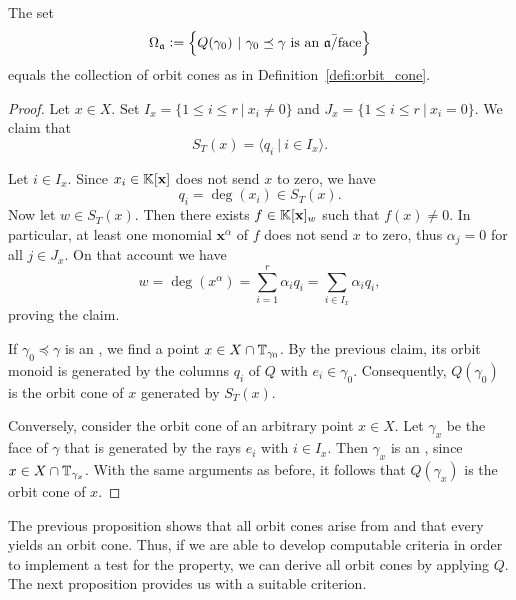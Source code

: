 \begin{prop}
	\label{prop:aface_orbit_cone_correspondence}
	The set
	$$\Omega_\ideal \defeq \left\{Q(\gamma_0)\ |\ \gamma_0\preceq\gamma \text{ is an } \ideal\text{\=/face}\right\}$$
	equals the collection of orbit cones as in Definition~\ref{defi:orbit_cone}.
\end{prop}
\begin{proof}
	Let $x\in X$. Set $I_x = \{1 \leq i \leq r\ |\ x_i \neq 0\}$ and $J_x = \{1 \leq i \leq r\ |\ x_i = 0\}$. We claim that
	$$S_T(x) = \langle q_i\ |\ i\in I_x\rangle.$$
	
	Let $i\in I_x$. Since $x_i\in\mathbb{K}[\mathbf{x}]$ does not send $x$ to zero, we have
	$$q_i = \deg(x_i)\in S_T(x).$$
	Now let $w\in S_T(x)$. Then there exists $f\in\mathbb{K}[\mathbf{x}]_w$ such that $f(x) \neq 0$. In particular, at least one monomial $\mathbf{x}^\alpha$ of $f$ does not send $x$ to zero, thus $\alpha_j = 0$ for all $j\in J_x$. On that account we have
	$$w = \deg(x^\alpha) = \sum_{i=1}^r \alpha_i q_i = \sum_{i\in I_x} \alpha_i q_i,$$
	proving the claim.
	
	If $\gamma_0\preceq\gamma$ is an \aface{}, we find a point $x\in X\cap \mathbb{T}_{\gamma_0}$. By the previous claim, its orbit monoid is generated by the columns $q_i$ of $Q$ with $e_i\in\gamma_0$. Consequently, $Q(\gamma_0)$ is the orbit cone of $x$ generated by $S_T(x)$.
	
	Conversely, consider the orbit cone of an arbitrary point $x\in X$. Let $\gamma_x$ be the face of $\gamma$ that is generated by the rays $e_i$ with $i\in I_x$. Then $\gamma_x$ is an \aface{}, since $x\in X\cap \mathbb{T}_{\gamma_x}$. With the same arguments as before, it follows that $Q(\gamma_x)$ is the orbit cone of $x$.
\end{proof}

The previous proposition shows that all orbit cones arise from \afaces{} and that every \aface{} yields an orbit cone. Thus, if we are able to develop computable criteria in order to implement a test for the \aface{} property, we can derive all orbit cones by applying $Q$. The next proposition provides us with a suitable criterion.

